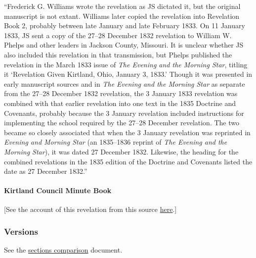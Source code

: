 				``Frederick G. Williams wrote the revelation as JS dictated it, but the original manuscript is not extant. Williams later copied the revelation into Revelation Book 2, probably between late January and late February 1833. On 11 January 1833, JS sent a copy of the 27--28 December 1832 revelation to William W. Phelps and other leaders in Jackson County, Missouri. It is unclear whether JS also included this revelation in that transmission, but Phelps published the revelation in the March 1833 issue of \textit{The Evening and the Morning Star}, titling it `Revelation Given Kirtland, Ohio, January 3, 1833.' Though it was presented in early manuscript sources and in \textit{The Evening and the Morning Star} as separate from the 27--28 December 1832 revelation, the 3 January 1833 revelation was combined with that earlier revelation into one text in the 1835 Doctrine and Covenants, probably because the 3 January revelation included instructions for implementing the school required by the 27--28 December revelation. The two became so closely associated that when the 3 January revelation was reprinted in \textit{Evening and Morning Star} (an 1835--1836 reprint of \textit{The Evening and the Morning Star}), it was dated 27 December 1832. Likewise, the heading for the combined revelations in the 1835 edition of the Doctrine and Covenants listed the date as 27 December 1832.''
				
		\paragraph{Kirtland Council Minute Book}
		
			[See the account of this revelation from this source \hyperref[EMS-1832-JS-27-28-DEC-1832-MIN]{here}.]
			
	\subsubsection{Versions}
		\label{DC88-V}
		
		See the \href{https://drive.google.com/file/d/1goAvNz8jS4R8slYfMG_db55Ty2z_vmgK/view?usp=sharing}{sections comparison} document.
	
